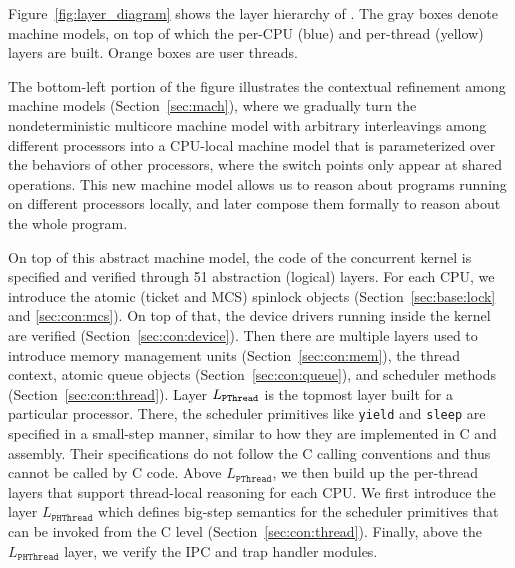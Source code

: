 
Figure~\ref{fig:layer_diagram} shows the layer hierarchy of  \cCTOS{}.
The gray boxes denote machine models, on top of which the
per-CPU (blue) and per-thread (yellow) layers are built. Orange boxes
are user threads.

The bottom-left portion of the figure illustrates the contextual refinement
among machine models (\cf Section~\ref{sec:mach}), where we gradually turn the nondeterministic
multicore machine model with arbitrary interleavings
among different processors into a CPU-local machine model that is parameterized
over the behaviors of other processors,
where the switch points only appear at shared operations. This new machine
model allows us to reason about programs running on different processors locally,
and later compose them formally to reason about the whole program.

On top of this abstract machine model, the code of the concurrent kernel is specified and 
verified through 51 abstraction (logical) layers. For each CPU,
we introduce the atomic (ticket and MCS) spinlock objects
(\cf Section~\ref{sec:base:lock} and \ref{sec:con:mcs}).
On top of that, the device drivers running inside the kernel are verified
(\cf Section~\ref{sec:con:device}).
Then there are multiple layers used to introduce memory management units (\cf Section~\ref{sec:con:mem}),
the thread context, atomic queue objects (\cf Section~\ref{sec:con:queue}), and scheduler methods (\cf Section~\ref{sec:con:thread}).
Layer $L_{\texttt{PThread}}$ is the topmost layer built for a particular processor.
There, the scheduler primitives like \texttt{yield} and \texttt{sleep}
are specified in a small-step manner, similar to how they are implemented
in C and assembly. Their specifications do not follow the C calling conventions
and thus cannot be called by C code. Above $L_\texttt{PThread}$, we then build up the 
per-thread layers that support thread-local reasoning for each CPU.
We first introduce the layer $L_\texttt{PHThread}$ which defines big-step semantics for
the scheduler primitives that can be invoked from the C level (\cf Section~\ref{sec:con:thread}).
Finally, above the $L_\texttt{PHThread}$ layer, we verify the
IPC and trap handler modules.

